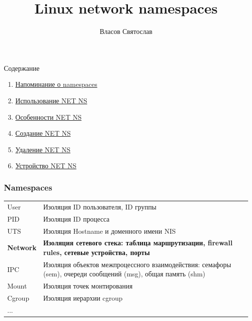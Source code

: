 
\makeatletter
{}
\makeatother
\graphicspath{{./fig/}}

\title{Linux network namespaces}
\author[Власов Святослав]{
    Власов Святослав
}


\maketitle

\begin{frame}{Содержание}
\begin{large}
\begin{enumerate}
	\item \hyperlink{namespaces_overview}{Напоминание о namespaces}
	\item \hyperlink{net_ns_usage}{Использование NET NS}
    \item \hyperlink{net_ns_features}{Особенности NET NS}
	\item \hyperlink{net_ns_create}{Создание NET NS}
	\item \hyperlink{net_ns_delete}{Удаление NET NS}
	\item \hyperlink{ns_net_under_hood}{Устройство NET NS}
\end{enumerate}
\end{large}
\end{frame}

\begin{frame}[label={namespaces_overview}]
\frametitle{Namespaces}
\begin{tabular}{lp{9cm}}
	\alert{User} & Изоляция ID пользователя, ID группы \\
	\alert{PID} & Изоляция ID процесса \\
	\alert{UTS} & Изоляция Hostname и доменного имени NIS \\
    \alert{\textbf{Network}} & \textbf{Изоляция сетевого стека: таблица маршрутизации, firewall rules, сетевые устройства, порты} \\
	\alert{IPC} & Изоляция объектов межпроцессного взаимодействия: семафоры (sem), очереди сообщений (msg), общая память (shm) \\
	\alert{Mount} & Изоляция точек монтирования \\
	\alert{Cgroup} & Изоляция иерархии cgroup \\
	... & 
\end{tabular}
\end{frame}

